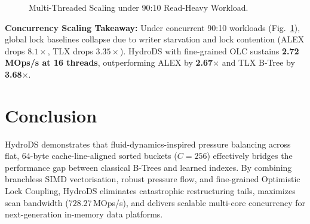 \documentclass[10pt,twocolumn,letterpaper]{article}
\theoremstyle{definition}
\begin{document}
\begin{figure}[H]
\centering
{}
\caption{Multi-Threaded Scaling under 90:10 Read-Heavy Workload.}
\label{fig:concurrent_scale}
\end{figure}

\noindent\textbf{Concurrency Scaling Takeaway:}
Under concurrent 90:10 workloads (Fig.~\ref{fig:concurrent_scale}), global lock baselines collapse due to writer starvation and lock contention (ALEX drops $8.1{\times}$, TLX drops $3.35{\times}$). HydroDS with fine-grained OLC sustains \textbf{2.72\,MOps/s at 16 threads}, outperforming ALEX by \textbf{2.67$\times$} and TLX B-Tree by \textbf{3.68$\times$}.

\section{Conclusion}
\label{sec:conclusion}

HydroDS demonstrates that fluid-dynamics-inspired pressure balancing across flat, 64-byte cache-line-aligned sorted buckets ($C{=}256$) effectively bridges the performance gap between classical B-Trees and learned indexes. By combining branchless SIMD vectorisation, robust pressure flow, and fine-grained Optimistic Lock Coupling, HydroDS eliminates catastrophic restructuring tails, maximizes scan bandwidth ($728.27$\,MOps/s), and delivers scalable multi-core concurrency for next-generation in-memory data platforms.
\end{document}

